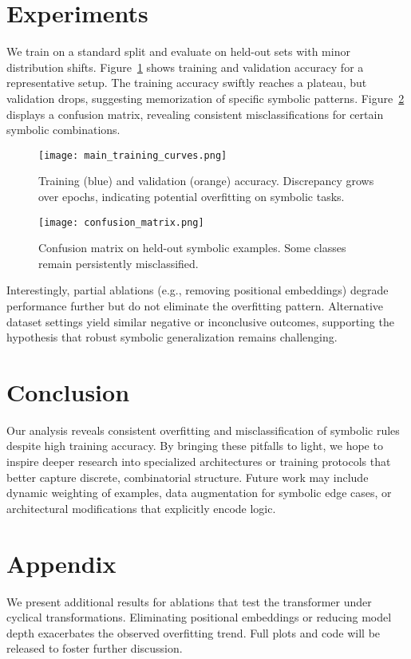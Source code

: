 \documentclass{article}
\begin{document}
\section{Experiments}
We train on a standard split and evaluate on held-out sets with minor distribution shifts. Figure~\ref{fig:acc_curves} shows training and validation accuracy for a representative setup. The training accuracy swiftly reaches a plateau, but validation drops, suggesting memorization of specific symbolic patterns. Figure~\ref{fig:conf_matrix} displays a confusion matrix, revealing consistent misclassifications for certain symbolic combinations.

\begin{figure}[t]
\centering
\texttt{[image: main\_training\_curves.png]}
\caption{Training (blue) and validation (orange) accuracy. Discrepancy grows over epochs, indicating potential overfitting on symbolic tasks.}
\label{fig:acc_curves}
\end{figure}

\begin{figure}[t]
\centering
\texttt{[image: confusion\_matrix.png]}
\caption{Confusion matrix on held-out symbolic examples. Some classes remain persistently misclassified.}
\label{fig:conf_matrix}
\end{figure}

Interestingly, partial ablations (e.g., removing positional embeddings) degrade performance further but do not eliminate the overfitting pattern. Alternative dataset settings yield similar negative or inconclusive outcomes, supporting the hypothesis that robust symbolic generalization remains challenging.

\section{Conclusion}
Our analysis reveals consistent overfitting and misclassification of symbolic rules despite high training accuracy. By bringing these pitfalls to light, we hope to inspire deeper research into specialized architectures or training protocols that better capture discrete, combinatorial structure. Future work may include dynamic weighting of examples, data augmentation for symbolic edge cases, or architectural modifications that explicitly encode logic.

\appendix
\section{Appendix}
We present additional results for ablations that test the transformer under cyclical transformations. Eliminating positional embeddings or reducing model depth exacerbates the observed overfitting trend. Full plots and code will be released to foster further discussion.



\end{document}
